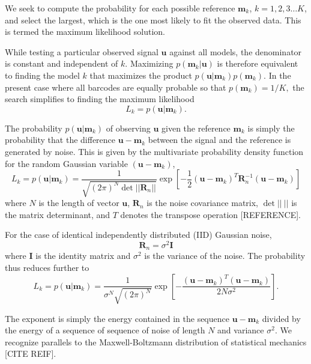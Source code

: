 We seek to compute the probability for each possible reference $\mathbf{m}_k$, $k=1,2,3 \ldots K$, and select the largest, which is the one most likely to fit the observed data. This is termed the maximum likelihood solution.

While testing a particular observed signal $\mathbf{u}$ against all models, the denominator is constant and independent of $k$. Maximizing $p(\mathbf{m}_k|\mathbf{u})$ is therefore equivalent to finding the model $k$ that maximizes the product  $p(\mathbf{u}|\mathbf{m}_k)p(\mathbf{m}_k)$.
In the present case where all barcodes are equally probable so that
$p(\mathbf{m}_k)=1/K,$ 
the search simplifies to finding the maximum likelihood 
\begin{equation}
L_k = p(\mathbf{u}|\mathbf{m}_k).
\end{equation}



The probability $p(\mathbf{u}|\mathbf{m}_k)$ of observing $\mathbf{u}$ given the reference $\mathbf{m}_k$ is simply the probability that the difference $\mathbf{u}-\mathbf{m}_k$ between the signal and the reference is generated by noise. This is given by the multivariate probability density function for the random Gaussian variable $(\mathbf{u}-\mathbf{m}_k)$, 
\begin{equation}\label{eq:Main}
L_k = p(\mathbf{u}|\mathbf{m}_k) = \frac{1}{  \sqrt{ (2\pi)^N \det || \mathbf{R}_n||} } \exp\left[ -\frac{1}{2}  (\mathbf{u}-\mathbf{m}_k)^T \mathbf{R}_n^{-1} (\mathbf{u}-\mathbf{m}_k) \right]
\end{equation}
where $N$ is the length of vector $\mathbf{u}$, $\mathbf{R}_n$ is the noise covariance matrix, $\det||{~}||$ is the matrix determinant, and $T$ denotes the transpose operation [REFERENCE].
 
For the case of identical independently distributed (IID) Gaussian noise, 
\begin{equation}
\mathbf{R}_n=\sigma^2 \mathbf{I}
\end{equation}
where $\mathbf{I}$ is the identity matrix and $\sigma^2$ is the variance of the noise. The probability thus reduces further to
\begin{equation}\label{eq:iidEnergy}
L_k = p(\mathbf{u}|\mathbf{m}_k) = \frac{1}{  \sigma^N \sqrt{ (2\pi)^N}   } \exp\left[ -\frac{(\mathbf{u}-\mathbf{m}_k)^T(\mathbf{u}-\mathbf{m}_k)} {2 N \sigma^2 } \right].
\end{equation}

The exponent is simply the energy contained in the sequence $\mathbf{u}-\mathbf{m}_k$ divided by the
energy of a sequence of sequence of noise of length $N$ and variance $\sigma^2$. We recognize parallels to the Maxwell-Boltzmann distribution of statistical mechanics [CITE REIF].  

